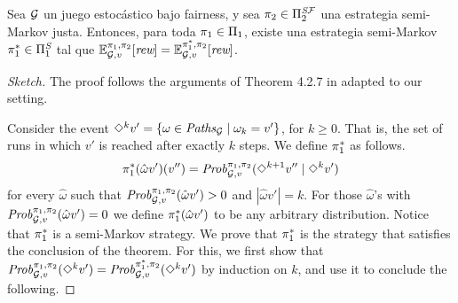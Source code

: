 \begin{theorem}\label{th:semmimarkov2}
  Sea $\mathcal{G}$ un juego estocástico bajo fairness,  y sea
  $\pi_{2} \in \Pi^{\textit{S}\mathcal{F}}_{2}$ una estrategia semi-Markov
  justa. Entonces, para toda $\pi_{1} \in \Pi_{1}$, existe una estrategia
  semi-Markov $\pi^*_{1} \in \Pi^{\textit{S}}_{1}$
  tal que
  $\mathbb{E}^{\pi_{1}, \pi_{2}}_{\mathcal{G}, v}[\textit{rew}] =
  \mathbb{E}^{\pi^*_{1}, \pi_{2}}_{\mathcal{G}, v}[\textit{rew}]$.
\end{theorem}
%
\iffalse
\begin{proof}[Sketch]
  The proof follows the arguments of Theorem 4.2.7 in \cite{FilarV96}
  adapted to our setting.
	
  Consider the event $\Diamond^{k} v' = \{ \omega \in
  \mathit{Paths}_{\mathcal{G}} \mid \omega_k = v'\}$, for $k\geq 0$. That is,
  the set of runs in which $v'$ is reached after exactly $k$ steps.
  We define $\pi^*_{1}$ as follows.
  \[
  \pi^*_{1}(\hat{\omega}v')(v'') =  \mathit{Prob}^{\pi_{1}, \pi_{2}}_{\mathcal{G},v}(\Diamond^{k+1} v'' \mid \Diamond^k v') 
  \]
  for every $\hat{\omega}$ such that $\mathit{Prob}^{\pi_{1}, \pi_{2}}_{\mathcal{G},v}(\hat{\omega}v') > 0$ and $|\hat{\omega}v'| = k$.  For those $\hat{\omega}$'s with $\mathit{Prob}^{\pi_{1}, \pi_{2}}_{\mathcal{G},v}(\hat{\omega}v') = 0$ we define $\pi^*_{1}(\hat{\omega}v')$ to be any arbitrary distribution.
  Notice that $\pi^*_{1}$ is a semi-Markov strategy.
  We prove that $\pi^*_{1}$ is the strategy that satisfies the
  conclusion of the theorem.
  For this, we first show that $\mathit{Prob}^{\pi_{1}, \pi_{2}}_{\mathcal{G},v}(\Diamond^{k} v') = \mathit{Prob}^{\pi^*_{1}, \pi_{2}}_{\mathcal{G},v}(\Diamond^{k} v')$ by induction on $k$, and use it to conclude the following. 

\end{proof}
